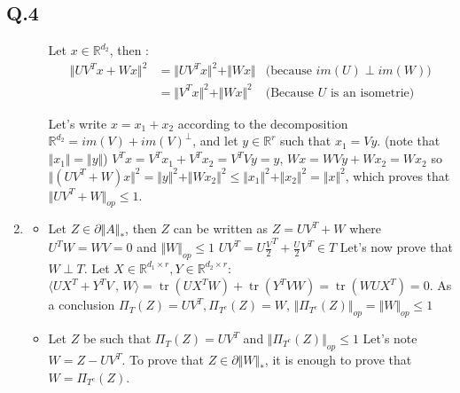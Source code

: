\documentclass[12pt]{article}
\newcommand{\Q}[1]{\subsection*{Q.#1}}
\newenvironment{question}[1]
{\Q{#1}}{}
\newcommand{\norm}[1]{\Vert #1 \Vert}
\newcommand{\nucnorm}[1]{\Vert #1 \Vert_*}
\newcommand{\opnorm}[1]{\Vert #1 \Vert_{op}}
\newcommand{\inner}[2]{\langle #1 \, , \, #2 \rangle}
\DeclareMathOperator{\tr}{tr}
\begin{document}
\begin{question}{4}
\begin{enumerate}
\begin{enumerate}
      Let $x \in \mathbb R^{d_2}$, then :
      \begin{align*}
        \norm{UV^Tx + Wx}^2 &= \norm{UV^Tx}^2 + \norm{Wx} &\text{(because $im(U) \perp im(W)$)}
        \\ &= \norm{V^Tx}^2 + \norm{Wx}^2 &\text{(Because $U$ is an isometrie)}
      \end{align*}

      Let's write $x = x_1 + x_2$ according to the decomposition $\mathbb R^{d_2} = im(V) + im(V)^{\perp}$, and let $y \in \mathbb R^r$ such that $x_1 = Vy$. (note that $\norm{x_1} = \norm{y}$)
      $V^Tx = V^T x_1 + V^T x_2 = V^TVy = y$, 
      $Wx = WV y + Wx_2 = Wx_2$ 
      so $\norm{(UV^T + W)x}^2 = \norm{y}^2 + \norm{Wx_2}^2 \le \norm{x_1}^2 + \norm{x_2}^2 = \norm{x}^2$, which proves that $\opnorm{UV^T + W} \le 1$.
      
    \end{enumerate}
  \item
    \begin{itemize}
    \item Let $Z \in \partial \nucnorm{A}$, then $Z$ can be written as $Z = UV^T + W$ where $U^TW = WV = 0$ and $\opnorm{W} \le 1$
      $UV^T = U\frac V2^T + \frac U2V^T \in T$
      Let's now prove that $W \perp T$. Let $X \in \mathbb R^{d_1 \times r}, Y \in \mathbb R^{d_2 \times r}$:
      $\inner{UX^T + Y^TV}{W} = \tr(UX^TW) + \tr(Y^TVW) = \tr(WUX^T) = 0$.
      As a conclusion $\Pi_T(Z) = UV^T, \Pi_{T^c}(Z) = W$, $\opnorm{\Pi_{T^c}(Z)} = \opnorm{W} \le 1$
    \item Let $Z$ be such that $\Pi_T(Z) = UV^T$ and $\opnorm{\Pi_{T^c}(Z)} \le 1$
      Let's note $W = Z - UV^T$.
      To prove that $Z \in \partial \nucnorm{W}$,
      it is enough to prove that $W = \Pi_{T^c}(Z)$.
    \end{itemize}
\end{enumerate}

\end{question}
\end{document}
